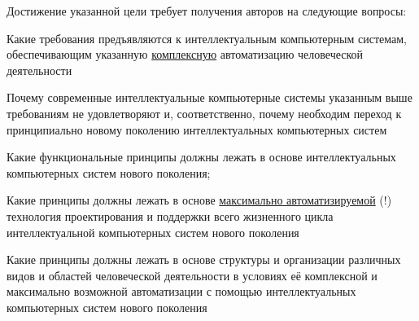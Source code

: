 Достижение указанной цели требует получения авторов на следующие вопросы:
\begin{textitemize}
	\item Какие требования предъявляются к интеллектуальным компьютерным системам, обеспечивающим указанную \uline{комплексную} автоматизацию человеческой деятельности
	\item Почему современные интеллектуальные компьютерные системы указанным выше требованиям не удовлетворяют и, соответственно, почему необходим переход к принципиально новому поколению интеллектуальных компьютерных систем
	\item Какие функциональные принципы должны лежать в основе интеллектуальных компьютерных систем нового поколения;
	\item Какие принципы должны лежать в основе \uline{максимально автоматизируемой} (!) технология проектирования и поддержки всего жизненного цикла интеллектуальной компьютерных систем нового поколения
	\item Какие принципы должны лежать в основе структуры и организации различных видов и областей человеческой деятельности в условиях её комплексной и максимально возможной автоматизации с помощью интеллектуальных компьютерных систем нового поколения
\end{textitemize}


